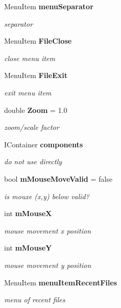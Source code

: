 \begin{CompactItemize}
Menu\-Item {\bf menu\-Separator}
\begin{CompactList}\small\item\em separator \item\end{CompactList}\item 
Menu\-Item {\bf File\-Close}
\begin{CompactList}\small\item\em close menu item \item\end{CompactList}\item 
Menu\-Item {\bf File\-Exit}
\begin{CompactList}\small\item\em exit menu item \item\end{CompactList}\item 
double {\bf Zoom} = 1.0
\begin{CompactList}\small\item\em zoom/scale factor \item\end{CompactList}\item 
IContainer {\bf components}
\begin{CompactList}\small\item\em do not use directly \item\end{CompactList}\item 
bool {\bf m\-Mouse\-Move\-Valid} = false
\begin{CompactList}\small\item\em is mouxe (x,y) below valid? \item\end{CompactList}\item 
int {\bf m\-Mouse\-X}
\begin{CompactList}\small\item\em mouse movement x position \item\end{CompactList}\item 
int {\bf m\-Mouse\-Y}
\begin{CompactList}\small\item\em mouse movement y position \item\end{CompactList}\item 
Menu\-Item {\bf menu\-Item\-Recent\-Files}
\begin{CompactList}\small\item\em menu of recent files \item\end{CompactList}\item 

\end{CompactItemize}
